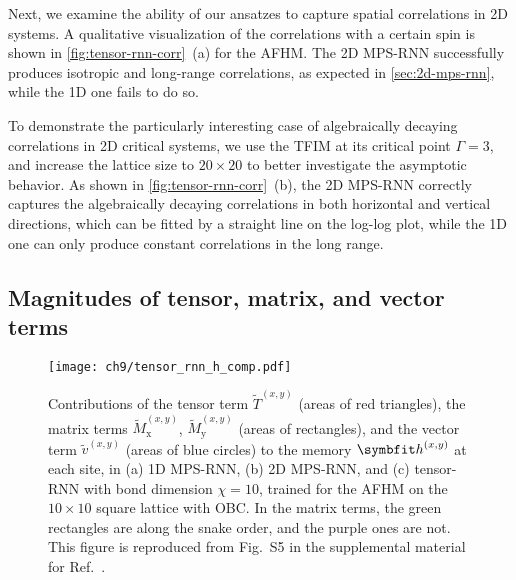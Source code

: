 Next, we examine the ability of our ansatzes to capture spatial correlations in 2D systems. A qualitative visualization of the correlations with a certain spin is shown in \cref{fig:tensor-rnn-corr}~(a) for the AFHM. The 2D MPS-RNN successfully produces isotropic and long-range correlations, as expected in \cref{sec:2d-mps-rnn}, while the 1D one fails to do so.

To demonstrate the particularly interesting case of algebraically decaying correlations in 2D critical systems, we use the TFIM at its critical point $\Gamma = 3$, and increase the lattice size to $20 \times 20$ to better investigate the asymptotic behavior. As shown in \cref{fig:tensor-rnn-corr}~(b), the 2D MPS-RNN correctly captures the algebraically decaying correlations in both horizontal and vertical directions, which can be fitted by a straight line on the log-log plot, while the 1D one can only produce constant correlations in the long range.

\subsection{Magnitudes of tensor, matrix, and vector terms}
\label{sec:tensor-rnn-magnitude}

\begin{figure}[htb]
\centering
\texttt{[image: ch9/tensor\_rnn\_h\_comp.pdf]}
\caption[Contributions of tensor, matrix, and vector terms in tensor-RNN]{
Contributions of the tensor term $\tilde{T}^{(x, y)}$ (areas of {\color[HTML]{d62728} red} triangles), the matrix terms $\tilde{M}^{(x, y)}_\text{x}$, $\tilde{M}^{(x, y)}_\text{y}$ (areas of rectangles), and the vector term $\tilde{v}^{(x, y)}$ (areas of {\color[HTML]{1f77b4} blue} circles) to the memory $\vh^{(x, y)}$ at each site, in (a) 1D MPS-RNN, (b) 2D MPS-RNN, and (c) tensor-RNN with bond dimension $\chi = 10$, trained for the AFHM on the $10 \times 10$ square lattice with OBC.
In the matrix terms, the {\color[HTML]{2ca02c} green} rectangles are along the snake order, and the {\color[HTML]{9467bd} purple} ones are not.
This figure is reproduced from Fig.~S5 in the supplemental material for Ref.~\cite{wu2023tensor}.
}
\label{fig:tensor-rnn-h-comp}
\end{figure}

